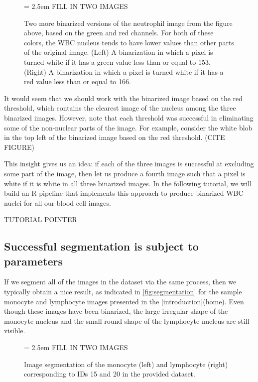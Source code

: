 \begin{figure}[p]
\centering
\tabcolsep = 2.5em
\mySfFamily
 FILL IN TWO IMAGES

\caption{Two more binarized versions of the neutrophil image from the figure above, based on the green and red channels. For both of these colors, the WBC nucleus tends to have lower values than other parts of the original image. (Left) A binarization in which a pixel is turned white if it has a green value less than or equal to 153. (Right) A binarization in which a pixel is turned white if it has a red value less than or equal to 166.}
\label{fig:neutrophil_binarized_other_colors}
\end{figure}

It would seem that we should work with the binarized image based on the red threshold, which contains the clearest image of the nucleus among the three binarized images. However, note that each threshold was successful in eliminating some of the non-nuclear parts of the image. For example, consider the white blob in the top left of the binarized image based on the red threshold. (CITE FIGURE)

This insight gives us an idea: if each of the three images is successful at excluding some part of the image, then let us produce a fourth image such that a pixel is white if it is white in all three binarized images. In the following tutorial, we will build an R pipeline that implements this approach to produce binarized WBC nuclei for all our blood cell images.

TUTORIAL POINTER

\FloatBarrier
{}
\subsection{Successful segmentation is subject to parameters}

If we segment all of the images in the dataset via the same process, then we typically obtain a nice result, as indicated in \autoref{fig:segmentation} for the sample monocyte and lymphocyte images presented in the [introduction](home). Even though these images have been binarized, the large irregular shape of the monocyte nucleus and the small round shape of the lymphocyte nucleus are still visible.

\begin{figure}[h]
\centering
\tabcolsep = 2.5em
\mySfFamily
 FILL IN TWO IMAGES

\caption{Image segmentation of the monocyte (left) and lymphocyte (right) corresponding to IDs 15 and 20 in the provided dataset.}
\label{fig:segmentation}
\end{figure}


